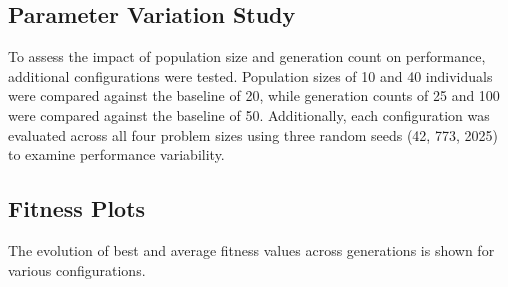 \documentclass[journal,12pt,onecolumn]{IEEEtran}
\begin{document}
\subsection{Parameter Variation Study}

To assess the impact of population size and generation count on performance, additional configurations were tested. Population sizes of 10 and 40 individuals were compared against the baseline of 20, while generation counts of 25 and 100 were compared against the baseline of 50. Additionally, each configuration was evaluated across all four problem sizes using three random seeds (42, 773, 2025) to examine performance variability.

\subsection{Fitness Plots}

The evolution of best and average fitness values across generations is shown for various configurations.
\end{document}
